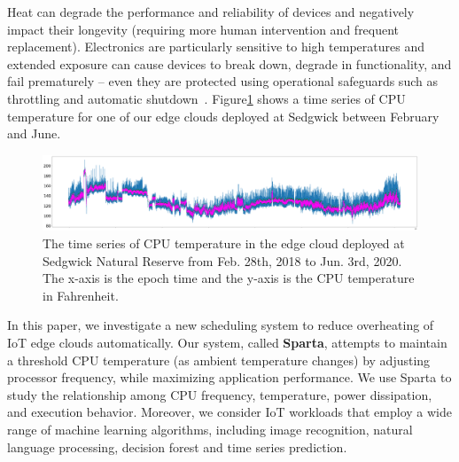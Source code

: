 Heat can degrade the performance and reliability of devices and negatively impact their longevity (requiring more human intervention and frequent replacement). Electronics are particularly sensitive to high temperatures and extended exposure can cause devices to break down, degrade in functionality, and fail prematurely -- even they are protected using operational safeguards such as throttling and automatic shutdown~\cite{ref:overheating}. Figure\ref{fig:time_series} shows a time series of CPU temperature for one of our edge clouds deployed at Sedgwick between February and June. 

\begin{figure}
\includegraphics[width=\textwidth]{figures/time_series.png}
\caption{The time series of CPU temperature in the edge cloud deployed at Sedgwick Natural Reserve from Feb. 28th, 2018 to Jun. 3rd, 2020. The x-axis is the epoch time and the y-axis is the CPU temperature in Fahrenheit. } \label{fig:time_series}
\end{figure}

In this paper, we investigate a new scheduling system to reduce overheating of IoT edge clouds automatically. Our system, called \textbf{Sparta}, attempts to maintain a threshold CPU temperature (as ambient temperature changes) by adjusting processor frequency, while maximizing application performance. We use Sparta to study the relationship among CPU frequency, temperature, power dissipation, and execution behavior. Moreover, we consider IoT workloads that employ a wide range of machine learning algorithms, including image recognition, natural language processing, decision forest and time series prediction. 


